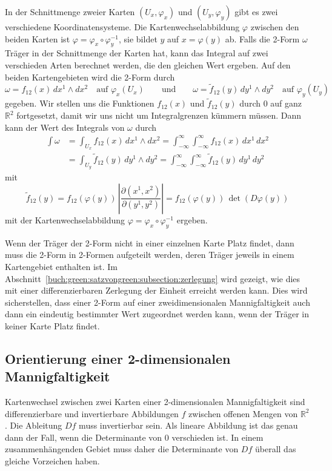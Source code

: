 In der Schnittmenge zweier Karten $(U_x,\varphi_x)$ und $(U_y,\varphi_y)$
gibt es zwei verschiedene Koordinatensysteme.
Die Kartenwechselabbildung $\varphi$ zwischen den beiden Karten ist
$\varphi=\varphi_x\circ\varphi_y^{-1}$, sie bildet $y$ auf
$x=\varphi(y)$ ab.
Falls die 2-Form $\omega$ Träger in der Schnittmenge der Karten hat,
kann das Integral auf zwei verschieden Arten berechnet werden,
die den gleichen Wert ergeben.
Auf den beiden Kartengebieten wird die 2-Form durch
\[
\omega
=
f_{12}(x)\,dx^1\wedge dx^2\quad\text{auf $\varphi_x(U_x)$}
\qquad\text{und}\qquad
\omega
=
\tilde{f}_{12}(y)\,dy^1\wedge dy^2\quad\text{auf $\varphi_y(U_y)$}
\]
gegeben.
Wir stellen uns die Funktionen $f_{12}(x)$ und $\tilde{f}_{12}(y)$
durch 0 auf ganz $\mathbb{R}^2$ fortgesetzt, damit wir uns nicht um
Integralgrenzen kümmern müssen.
Dann kann der Wert des Integrals von $\omega$ durch
\begin{equation}
\begin{aligned}
\int \omega
&=
\int_{U_x} f_{12}(x) \,dx^1\wedge dx^2
=
\int_{-\infty}^\infty\int_{-\infty}^\infty f_{12}(x)\,dx^1\,dx^2
\\
&=
\int_{U_y} \tilde{f}_{12}(y) \,dy^1\wedge dy^2
=
\int_{-\infty}^\infty\int_{-\infty}^\infty \tilde{f}_{12}(y)\,dy^1\,dy^2
\end{aligned}
\label{buch:green:flaechenintegral:eqn:2integrale}
\end{equation}
mit
\[
\tilde{f}_{12}(y)
=
f_{12}(\varphi(y))
\,
\left|
\frac{\partial(x^1,x^2)}{\partial(y^1,y^2)}
\right|
=
f_{12}(\varphi(y))
\,
\det(D\varphi(y))
\]
mit der Kartenwechselabbildung $\varphi=\varphi_x\circ\varphi_y^{-1}$
ergeben.

Wenn der Träger der 2-Form nicht in einer einzelnen Karte Platz
findet, dann muss die 2-Form in 2-Formen aufgeteilt werden, deren
Träger jeweils in einem Kartengebiet enthalten ist.
Im Abschnitt~\ref{buch:green:satzvongreen:subsection:zerlegung}
wird gezeigt, wie dies mit einer differenzierbaren Zerlegung
der Einheit erreicht werden kann.
Dies wird sicherstellen, dass einer 2-Form auf einer
zweidimensionalen Mannigfaltigkeit auch dann ein eindeutig bestimmter
Wert zugeordnet werden kann, wenn der Träger in keiner Karte Platz
findet.

%
%
\subsection{Orientierung einer 2-dimensionalen Mannigfaltigkeit}
Kartenwechsel zwischen zwei Karten einer 2-dimensionalen
Mannigfaltigkeit sind differenzierbare und invertierbare Abbildungen
$f$ zwischen offenen Mengen von $\mathbb{R}^2$.
Die Ableitung $Df$ muss invertierbar sein.
Als lineare Abbildung ist das genau dann der Fall, wenn die Determinante
von $0$ verschieden ist.
In einem zusammenhängenden Gebiet muss daher die Determinante
von $Df$ überall das gleiche Vorzeichen haben.

